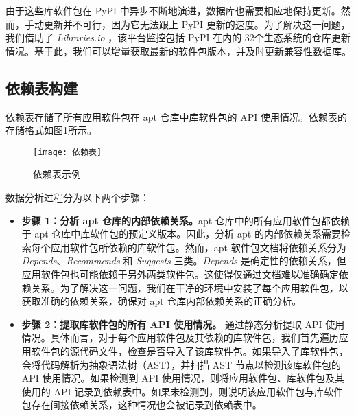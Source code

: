 由于这些库软件包在 PyPI 中异步不断地演进，数据库也需要相应地保持更新。然而，手动更新并不可行，因为它无法跟上 PyPI 更新的速度。为了解决这一问题，我们借助了 \textit{Libraries.io} ，该平台监控包括 PyPI 在内的 32个生态系统的仓库更新情况。基于此，我们可以增量获取最新的软件包版本，并及时更新兼容性数据库。

\subsection{依赖表构建}\label{4.1.2}
依赖表存储了所有应用软件包在 apt 仓库中库软件包的 API 使用情况。依赖表的存储格式如图\ref{fig:dependency}所示。
\begin{figure}[htbp] %
	\centering
	\texttt{[image: 依赖表]}
	\caption{依赖表示例}
	\label{fig:dependency}
\end{figure}
数据分析过程分为以下两个步骤：
\begin{itemize}
	\item \textbf{步骤 1：分析 apt 仓库的内部依赖关系。}apt 仓库中的所有应用软件包都依赖于 apt 仓库中库软件包的预定义版本。因此，分析 apt 的内部依赖关系需要检索每个应用软件包所依赖的库软件包。然而，apt 软件包文档将依赖关系分为 \textit{Depends}、\textit{Recommends} 和 \textit{Suggests} 三类。\textit{Depends} 是确定性的依赖关系，但应用软件包也可能依赖于另外两类软件包。这使得仅通过文档难以准确确定依赖关系。为了解决这一问题，我们在干净的环境中安装了每个应用软件包，以获取准确的依赖关系，确保对 apt 仓库内部依赖关系的正确分析。
	\item \textbf{步骤 2：提取库软件包的所有 API 使用情况。}\tool{} 通过静态分析提取 API 使用情况。具体而言，对于每个应用软件包及其依赖的库软件包，我们首先遍历应用软件包的源代码文件，检查是否导入了该库软件包。如果导入了库软件包，\tool{} 会将代码解析为抽象语法树（AST），并扫描 AST 节点以检测该库软件包的 API 使用情况。如果检测到 API 使用情况，则将应用软件包、库软件包及其使用的 API 记录到依赖表中。如果未检测到，则说明该应用软件包与库软件包存在间接依赖关系，这种情况也会被记录到依赖表中。
\end{itemize}
